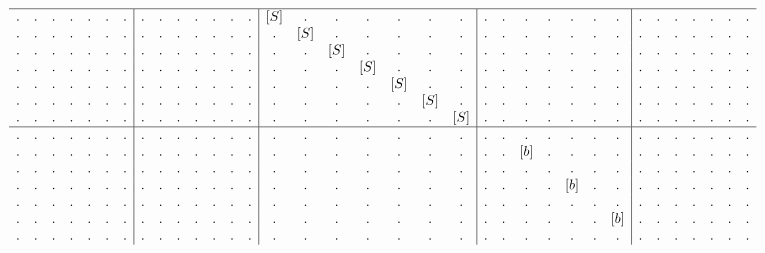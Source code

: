 \begin{example}
\begin{align}
\begin{array}{c c c c c c c | c c c c c c c | c c c c c c c | c c c c c c c | c c c c c c c}
\hline
. & . & . & . & . & . & .  &  . & . & . & . & . & . & .  &  [S] & . & . & . & . & . & .  &  . & . & . & . & . & . & .  &  . & . & . & . & . & . & .   \\
. & . & . & . & . & . & .  &  . & . & . & . & . & . & .  &  . & [S] & . & . & . & . & .  &  . & . & . & . & . & . & .  &  . & . & . & . & . & . & .   \\
. & . & . & . & . & . & .  &  . & . & . & . & . & . & .  &  . & . & [S] & . & . & . & .  &  . & . & . & . & . & . & .  &  . & . & . & . & . & . & .   \\
. & . & . & . & . & . & .  &  . & . & . & . & . & . & .  &  . & . & . & [S] & . & . & .  &  . & . & . & . & . & . & .  &  . & . & . & . & . & . & .   \\
. & . & . & . & . & . & .  &  . & . & . & . & . & . & .  &  . & . & . & . & [S] & . & .  &  . & . & . & . & . & . & .  &  . & . & . & . & . & . & .   \\
. & . & . & . & . & . & .  &  . & . & . & . & . & . & .  &  . & . & . & . & . & [S] & .  &  . & . & . & . & . & . & .  &  . & . & . & . & . & . & .   \\
. & . & . & . & . & . & .  &  . & . & . & . & . & . & .  &  . & . & . & . & . & . & [S]  &  . & . & . & . & . & . & .  &  . & . & . & . & . & . & .   \\
\hline
. & . & . & . & . & . & .  &  . & . & . & . & . & . & .  &  . & . & . & . & . & . & .  &  . & . & .   & . & .   & . & .    &  . & . & . & . & . & . & .   \\
. & . & . & . & . & . & .  &  . & . & . & . & . & . & .  &  . & . & . & . & . & . & .  &  . & . & [b] & . & .   & . & .    &  . & . & . & . & . & . & .   \\
. & . & . & . & . & . & .  &  . & . & . & . & . & . & .  &  . & . & . & . & . & . & .  &  . & . & .   & . & .   & . & .    &  . & . & . & . & . & . & .   \\
. & . & . & . & . & . & .  &  . & . & . & . & . & . & .  &  . & . & . & . & . & . & .  &  . & . & .   & . & [b] & . & .    &  . & . & . & . & . & . & .   \\
. & . & . & . & . & . & .  &  . & . & . & . & . & . & .  &  . & . & . & . & . & . & .  &  . & . & .   & . & .   & . & .    &  . & . & . & . & . & . & .   \\
. & . & . & . & . & . & .  &  . & . & . & . & . & . & .  &  . & . & . & . & . & . & .  &  . & . & .   & . & .   & . & [b]  &  . & . & . & . & . & . & .   \\
. & . & . & . & . & . & .  &  . & . & . & . & . & . & .  &  . & . & . & . & . & . & .  &  . & . & .   & . & .   & . & .    &  . & . & . & . & . & . & .   \\

\end{array}
\end{align}
\end{example}
